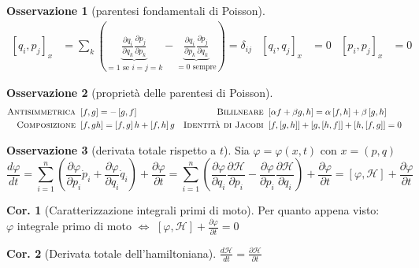 \documentclass[a4paper,10pt]{article}
\theoremstyle{definition}
\theoremstyle{indentdefinition}
\theoremstyle{indenttheorem}
\newtheorem{cor}{Cor.}
\theoremstyle{myremark}
\newtheorem*{rem*}{Osservazione}
\theoremstyle{indentgeneral}
\newenvironment{myboxed} 
{\noindent\begin{lrbox}{\mybox}\begin{minipage}{\textwidth}}
{\end{minipage}\end{lrbox}\fbox{\usebox{\mybox}}}
\begin{document}
\begin{rem*}[parentesi fondamentali di Poisson]
\label{rem:parentesi-fondamentali-Poisson}
\begin{align*}
\left[q_{i},p_{j}\right]_{x} & =\sum_{k}(\underbrace{\frac{\partial q_{i}}{\partial q_{k}}\frac{\partial p_{j}}{\partial p_{k}}}_{=1 \text{ se }i=j=k}-\underbrace{\frac{\partial q_{i}}{\partial p_{k}}\frac{\partial p_{j}}{\partial q_{k}}}_{=0 \text{ sempre}})=\delta_{ij} & \left[q_{i},q_{j}\right]_{x} & =0 & \left[p_{i},p_{j}\right]_{x} & =0
\end{align*}
\end{rem*}
%
\begin{rem*}[proprietà delle parentesi di Poisson]
\begin{align*}
\textsc{Antisimmetrica } & \left[f,g\right]=-\left[g,f\right] & \textsc{Bililneare } & \left[\alpha f+\beta g,h\right]=\alpha\left[f,h\right]+\beta\left[g,h\right]\\
\textsc{Composizione } & \left[f,gh\right]=\left[f,g\right]h+\left[f,h\right]g & \textsc{Identità di Jacobi } & \left[f,\left[g,h\right]\right]+\left[g,\left[h,f\right]\right]+\left[h,\left[f,g\right]\right]=0
\end{align*}
\end{rem*}
%
\begin{rem*}[derivata totale rispetto a $t$]
Sia $\varphi=\varphi\left(x,t\right)$ con $x=\left(p,q\right)$
\[
\frac{d\varphi}{dt}=\sum_{i=1}^{n}\left(\frac{\partial\varphi}{\partial p_{i}}\dot{p}_{i}+\frac{\partial\varphi}{\partial q_{i}}\dot{q}_{i}\right)+\frac{\partial\varphi}{\partial t}=\sum_{i=1}^{n}\left(\frac{\partial\varphi}{\partial q_{i}}\frac{\partial\mathcal{H}}{\partial p_{i}}-\frac{\partial\varphi}{\partial p_{i}}\frac{\partial\mathcal{H}}{\partial q_{i}}\right)+\frac{\partial\varphi}{\partial t}=\left[\varphi,\mathcal{H}\right]+\frac{\partial\varphi}{\partial t}
\]\end{rem*}

\begin{myboxed}
\begin{cor}[Caratterizzazione integrali primi di moto]
    Per quanto appena visto:\\
    $\varphi$ integrale primo di moto $\Longleftrightarrow$
$\left[\varphi,\mathcal{H}\right]+\frac{\partial\varphi}{\partial t}=0$
\end{cor}
\end{myboxed}

\begin{cor}[Derivata totale dell'hamiltoniana]
    $\frac{d\mathcal{H}}{dt}=\frac{\partial\mathcal{H}}{\partial t}$
\end{cor}
\end{document}
